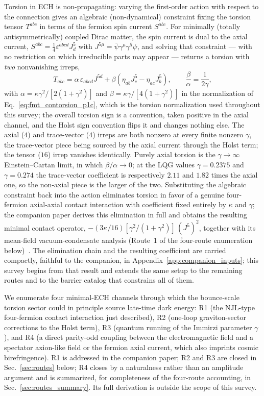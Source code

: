 \documentclass[aps,prd,twocolumn,superscriptaddress,showpacs,preprintnumbers,nofootinbib,longbibliography,floatfix]{revtex4-2}
\begin{document}
Torsion in ECH is non-propagating: varying the first-order action with
respect to the connection gives an algebraic (non-dynamical) constraint
fixing the torsion tensor $T^{abc}$ in terms of the fermion spin current
$S^{abc}$. For minimally (totally
antisymmetrically) coupled Dirac matter, the spin current is dual to the
axial current, $S^{abc}=\tfrac14\varepsilon^{abcd}J^5_d$ with
$J^{5\mu}=\bar\psi\gamma^\mu\gamma^5\psi$, and solving that constraint
--- with no restriction on which irreducible parts may appear --- returns
a torsion with \emph{two} nonvanishing irreps,
\begin{equation}\label{eq:ech_onshell_torsion}
T_{abc}=\alpha\,\varepsilon_{abcd}J^{5d}
+\beta\left(\eta_{ab}J^5_c-\eta_{ac}J^5_b\right),
\qquad
\frac{\beta}{\alpha}=\frac{1}{2\gamma},
\end{equation}
with
$\alpha=\kappa\gamma^{2}/[2(1+\gamma^{2})]$ and
$\beta=\kappa\gamma/[4(1+\gamma^{2})]$ in the normalization of
Eq.~\eqref{eq:fmt_contorsion_p1c}, which is the torsion normalization used
throughout this survey; the overall torsion sign is a convention, taken
positive in the axial channel, and the Holst sign convention flips it and
changes nothing else. The axial ($4$) and trace-vector ($4$) irreps are
both nonzero at every finite nonzero $\gamma$, the trace-vector piece
being sourced by the axial current through the Holst term; the tensor
($16$) irrep vanishes identically. Purely axial torsion is the
$\gamma\to\infty$ Einstein--Cartan limit, in which $\beta/\alpha\to0$; at
the LQG values $\gamma=0.2375$ and $\gamma=0.274$ the trace-vector
coefficient is respectively $2.11$ and $1.82$ times the axial one, so the
non-axial piece is the larger of the two. Substituting the algebraic
constraint back into the action eliminates torsion in favor of a genuine
four-fermion axial-axial contact interaction with coefficient fixed
entirely by $\kappa$ and $\gamma$; the companion paper derives this
elimination in full and obtains the resulting minimal contact operator,
$-(3\kappa/16)[\gamma^2/(1+\gamma^2)]\,(J^5)^2$, together with its
mean-field vacuum-condensate analysis (Route~1 of the four-route
enumeration below)~\cite{Golden2026P1a}. The elimination chain and the
resulting coefficient are carried compactly, faithful to the companion,
in Appendix~\ref{app:companion_inputs}; this survey begins from that
result and extends the same setup to the remaining routes and to the
barrier catalog that constrains all of them.

We enumerate four minimal-ECH channels through which the bounce-scale
torsion sector could in principle source late-time dark energy: R1 (the
NJL-type four-fermion contact interaction just described), R2 (one-loop
graviton-sector corrections to the Holst term), R3 (quantum running of the
Immirzi parameter $\gamma$), and R4 (a direct parity-odd coupling between
the electromagnetic field and a spectator axion-like field or the fermion
axial current, which also imprints cosmic birefringence). R1 is addressed
in the companion paper; R2 and R3 are closed in Sec.~\ref{sec:routes}
below; R4 closes by a naturalness rather than an amplitude argument and is
summarized, for completeness of the four-route accounting, in
Sec.~\ref{sec:routes_summary}. Its full derivation is outside the scope of
this survey.
\end{document}
